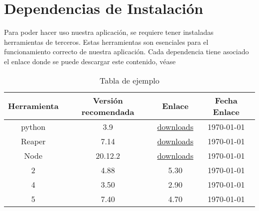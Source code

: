 \chapter{Dependencias de Instalación}
\label{Appendix:Key1}

Para poder hacer uso nuestra aplicación, se requiere tener instaladas herramientas de terceros. Estas herramientas son esenciales para el funcionamiento correcto de nuestra aplicación.
Cada dependencia tiene asociado el enlace donde se puede descargar este contenido, véase


\begin{table}
    \centering
	\begin{tabular}{c|c|c|c}
		\textbf{Herramienta} & \textbf{Versión recomendada} & \textbf{Enlace} & \textbf{Fecha Enlace} \\
		\hline\hline
		python & 3.9 & \href{https://www.python.org/downloads/release/python-390/}{downloads} & \today\\
		Reaper & 7.14 & \href{https://www.reaper.fm/download.php}{downloads} & \today\\
		Node & 20.12.2 & \href{https://nodejs.org/en/download}{downloads} & \today\\
		2 & 4.88 & 5.30 & \today\\
		4 & 3.50 & 2.90 & \today\\
		5 & 7.40 & 4.70 & \today\\
		\hline
	\end{tabular}
	\caption{Tabla de ejemplo}
	\label{tab:sampleTable}
\end{table}
